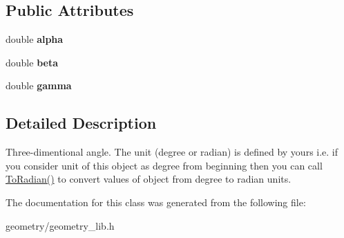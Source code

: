 \subsection*{Public Attributes}
\begin{DoxyCompactItemize}
\item 
\mbox{\label{class_angle_ad75fbb9a44298ccf044813020e566022}} 
double {\bfseries alpha}
\item 
\mbox{\label{class_angle_a04433ed74d977eb0785e23a0518e8456}} 
double {\bfseries beta}
\item 
\mbox{\label{class_angle_a01740ca43b0032dad4d50c3c40de2606}} 
double {\bfseries gamma}
\end{DoxyCompactItemize}


\subsection{Detailed Description}
Three-\/dimentional angle. The unit (degree or radian) is defined by yours i.\+e. if you consider unit of this object as degree from beginning then you can call \mbox{\hyperlink{class_angle_a72dd5f472528fe9edaaafaf91d71670e}{To\+Radian()}} to convert values of object from degree to radian units. 

The documentation for this class was generated from the following file\+:\begin{DoxyCompactItemize}
\item 
geometry/geometry\+\_\+lib.\+h\end{DoxyCompactItemize}
